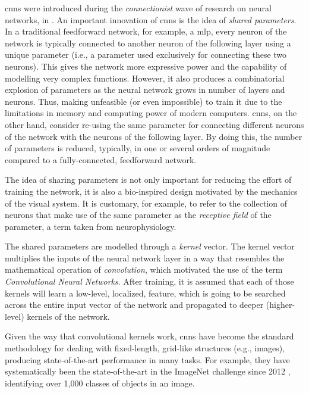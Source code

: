 

\glspl{cnn} were introduced during the \emph{connectionist}
wave of research on neural networks, in
\textcite{lecun1989generalization, lecun1989handwritten}. An
important innovation of \glspl{cnn} is the idea of
\emph{shared parameters}. In a traditional feedforward
network, for example, a \gls{mlp}, every neuron of the
network is typically connected to another neuron of the
following layer using a unique parameter (i.e., a parameter
used exclusively for connecting these two neurons). This
gives the network more expressive power and the capability
of modelling very complex functions. However, it also
produces a combinatorial explosion of parameters as the
neural network grows in number of layers and neurons. Thus,
making unfeasible (or even impossible) to train it due to
the limitations in memory and computing power of modern
computers. \glspl{cnn}, on the other hand, consider re-using
the same parameter for connecting different neurons of the
network with the neurons of the following layer. By doing
this, the number of parameters is reduced, typically, in one
or several orders of magnitude compared to a
fully-connected, feedforward network.

The idea of sharing parameters is not only important for
reducing the effort of training the network, it is also a
bio-inspired design motivated by the mechanics of the visual
system. It is customary, for example, to refer to the
collection of neurons that make use of the same parameter as
the \emph{receptive field} of the parameter, a term taken
from neurophysiology.

The shared parameters are modelled through a \emph{kernel}
vector. The kernel vector multiplies the inputs of the
neural network layer in a way that resembles the
mathematical operation of \emph{convolution}, which
motivated the use of the term \emph{Convolutional Neural
Networks}. After training, it is assumed that each of those
kernels will learn a low-level, localized, feature, which is
going to be searched across the entire input vector of the
network and propagated to deeper (higher-level) kernels of
the network.

Given the way that convolutional kernels work, \glspl{cnn}
have become the standard methodology for dealing with
fixed-length, grid-like structures (e.g., images), producing
state-of-the-art performance in many tasks. For example,
they have systematically been the state-of-the-art in the
ImageNet challenge since 2012
\parencite{krizhevsky2012imagenet}, identifying over 1,000
classes of objects in an image.

